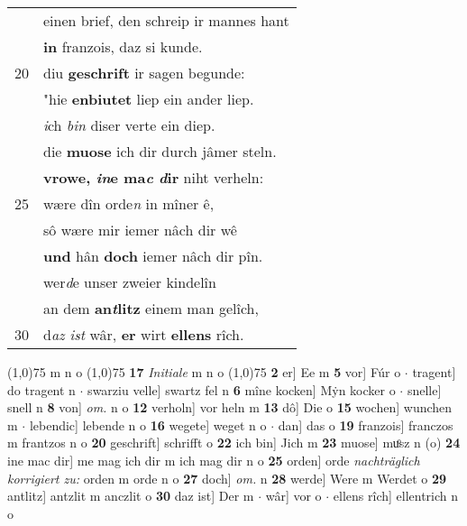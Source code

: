 \documentclass[8pt,a4paper,notitlepage]{article}
\begin{document}
\begin{table}[ht]
\begin{minipage}[t]{0.5\linewidth}
\begin{tabular}{rl}
 & einen brief, den schreip ir mannes hant\\ 
 & \textbf{in} franzois, daz si kunde.\\ 
20 & diu \textbf{geschrift} ir sagen begunde:\\ 
 & "hie \textbf{enbiutet} liep ein ander liep.\\ 
 & \textit{i}ch \textit{bin} diser verte ein diep.\\ 
 & die \textbf{muose} ich dir durch jâmer steln.\\ 
 & \textbf{vrowe, \textit{in}e ma\textit{c} \textit{d}ir} niht verheln:\\ 
25 & wære dîn orde\textit{n} in mîner ê,\\ 
 & sô wære mir iemer nâch dir wê\\ 
 & \textbf{und} hân \textbf{doch} iemer nâch dir pîn.\\ 
 & wer\textit{d}e unser zweier kindelîn\\ 
 & an dem \textbf{an\textit{t}litz} einem man gelîch,\\ 
30 & d\textit{az ist} wâr, \textbf{er} wirt \textbf{ellens} rîch.\\ 
\end{tabular}
\scriptsize
\line(1,0){75} \newline
m n o \newline
\line(1,0){75} \newline
\textbf{17} \textit{Initiale} m n o  \newline
\line(1,0){75} \newline
\textbf{2} er] Ee m \textbf{5} vor] Fúr o  $\cdot$ tragent] do tragent n  $\cdot$ swarziu velle] swartz fel n \textbf{6} mîne kocken] Mẏn kocker o  $\cdot$ snelle] snell n \textbf{8} von] \textit{om.} n o \textbf{12} verholn] vor heln m \textbf{13} dô] Die o \textbf{15} wochen] wunchen m  $\cdot$ lebendic] lebende n o \textbf{16} wegete] weget n o  $\cdot$ dan] das o \textbf{19} franzois] franczos m frantzos n o \textbf{20} geschrift] schrifft o \textbf{22} ich bin] Jich m \textbf{23} muose] muͦsz n (o) \textbf{24} ine mac dir] me mag ich dir m ich mag dir n o \textbf{25} orden] orde \textit{nachträglich korrigiert zu:} orden m orde n o \textbf{27} doch] \textit{om.} n \textbf{28} werde] Were m Werdet o \textbf{29} antlitz] antzlit m anczlit o \textbf{30} daz ist] Der m  $\cdot$ wâr] vor o  $\cdot$ ellens rîch] ellentrich n o \newline
\end{minipage}
\end{table}
\newpage
\end{document}
